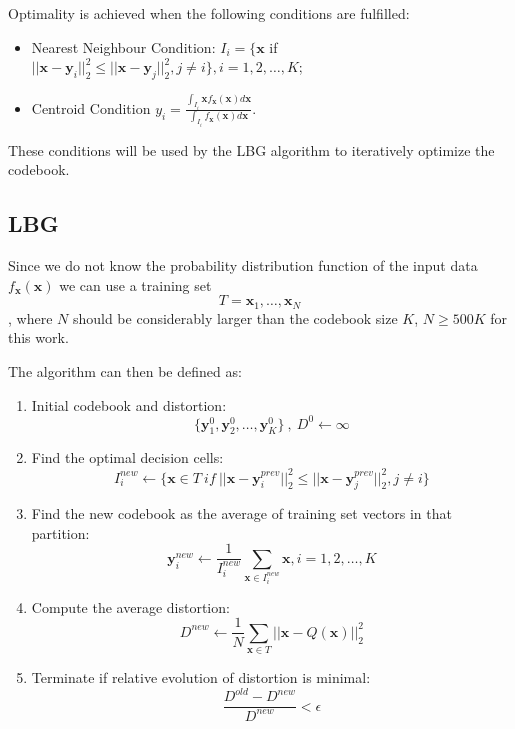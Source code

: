 \documentclass[a4paper, 11pt]{article}
\begin{document}
		Optimality is achieved when the following conditions are fulfilled:
		\begin{itemize}
			\item Nearest Neighbour Condition: $ I_i = \{\mathbf{x} $  if $||\mathbf{x} - \mathbf{y}_i||_2^2 \leq  ||\mathbf{x} - \mathbf{y}_j||_2^2, j\neq i\}, i=1,2,\ldots,K $;
			\item Centroid Condition $y_i = \frac{\int_{I_i} \mathbf{x} f_{\mathbf{x}}(\mathbf{x})d\mathbf{x}}{\int_{I_i} f_{\mathbf{x}}(\mathbf{x})d\mathbf{x}} $.
		\end{itemize}
		These conditions will be used by the LBG algorithm to iteratively optimize the codebook.
			
		\subsection{LBG}
			Since we do not know the probability distribution function of the input data $ f_{\mathbf{x}}(\mathbf{x}) $ we can use a training set
			\begin{equation}
				T = {\mathbf{x}_1,\ldots,\mathbf{x}_N}
			\end{equation},
			where $N$ should be considerably larger than the codebook size $ K $, $  N \ge 500K $ for this work.
			
			The algorithm can then be defined as:
			\begin{enumerate}
				\item Initial codebook and distortion: 
				$$ \{\mathbf{y}_1^{0}, \mathbf{y}_2^{0}, \ldots, \mathbf{y}_K^{0}\}\ ,\  D^{0} \gets \infty $$
				\item Find the optimal decision cells:
				$$ I_i^{new} \gets \{\mathbf{x} \in T \ if \ ||\mathbf{x} - \mathbf{y}_i^{prev}||_2^2 \leq  ||\mathbf{x} - \mathbf{y}_j^{prev}||_2^2, j\neq i\} $$
				\item Find the new codebook as the average of training set vectors in that partition: 
				$$ \mathbf{y}_i^{new} \gets \frac{1}{I_i^{new}} \sum_{\mathbf{x} \in I_i^{new}} \mathbf{x}, i=1,2,\ldots,K$$
				\item Compute the average distortion:
				$$ D^{new} \gets \frac{1}{N} \sum_{\mathbf{x} \in T} ||\mathbf{x} - Q(\mathbf{x})||^2_2$$ 
				\item Terminate if relative evolution of distortion is minimal:
				$$ \frac{ D^{old}- D^{new}}{D^{new}} < \epsilon$$
			\end{enumerate}
		
\end{document}
